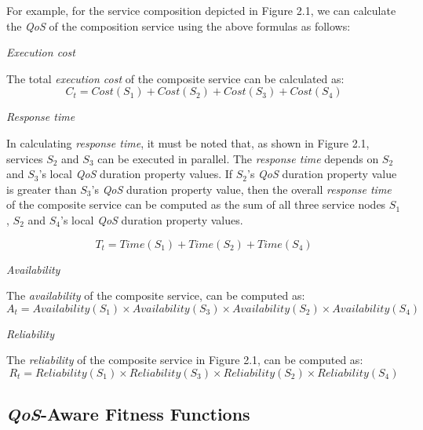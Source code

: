 \begin{exmp}
For example, for the service composition depicted in Figure 2.1, we can calculate the \emph{QoS} of the composition service using the above formulas as follows:
\setlength{\textfloatsep}{20pt}%

\setlength{\textfloatsep}{20pt}%
\emph{Execution cost}\par
The total \emph{execution cost} of the composite service can be calculated as: 
$$C_t = Cost(S_1) + Cost(S_2) + Cost(S_3) + Cost(S_4)$$
\setlength{\textfloatsep}{20pt}%

\setlength{\textfloatsep}{20pt}%
\emph{Response time}\par
In calculating \emph{response time}, it must be noted that, as shown in Figure 2.1, services $S_{2}$ and $S_{3}$ can be executed in parallel. The \emph{response time} depends on $S_{2}$ and $S_{3}$'s local \emph{QoS} duration property values. If $S_{2}$'s \emph{QoS} duration property value is greater than $S_{3}$'s \emph{QoS} duration property value, then the overall \emph{response time} of the composite service can be computed as the sum of all three service nodes $S_{1}$, $S_{2}$ and $S_{4}$'s local \emph{QoS} duration property values.\par  
$$T_t = Time(S_1) + Time(S_2) + Time(S_4)$$          
\setlength{\textfloatsep}{20pt}%

\setlength{\textfloatsep}{20pt}%
\emph{Availability}\par

The \emph{availability} of the composite service, can be computed as:
$$A_t = Availability(S_{1}) \times Availability(S_{3}) \times  Availability(S_{2}) \times Availability(S_{4}) $$
\setlength{\textfloatsep}{20pt}%

\setlength{\textfloatsep}{20pt}%
\emph{Reliability}\par
The \emph{reliability} of the composite service in Figure 2.1, 
can be computed as:
  $$R_t = Reliability(S_{1}) \times Reliability(S_{3}) \times Reliability(S_{2}) \times Reliability(S_{4})$$

\setlength{\textfloatsep}{20pt}%

\end{exmp}

\subsection {\emph{QoS}-Aware Fitness Functions} \label{fitnessFunction}

